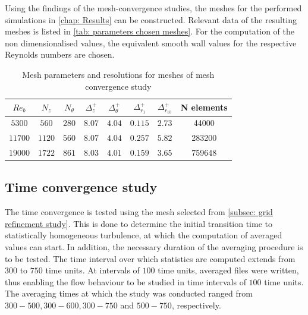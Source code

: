 Using the findings of the mesh-convergence studies, the meshes for the performed simulations in \autoref{chap: Results} can be constructed.
Relevant data of the resulting meshes is listed in \autoref{tab: parameters chosen meshes}.
For the computation of the non dimensionalised values, the equivalent smooth wall values for the respective Reynolds numbers are chosen.
\begin{table}[h!]
    \centering
    \caption[Mesh data of mesh convergence study]{Mesh parameters and resolutions for meshes of mesh convergence study}
    \begin{tabular}{ c c c c c c c c } 
        \toprule
        $Re_b$  & $N_z$     & $N_{\theta}$  & $\Delta^+_z$    & $\Delta^+_\theta$   & $\Delta^+_{r_1}$  & $\Delta^+_{r_{10}}$   & N elements \\
        \midrule
        $5300$  & $560$     & $280$         & $8.07$        & $4.04$            & $0.115$           & $2.73$                & 44000\\ 
        $11700$ & $1120$    & $560$         & $8.07$        & $4.04$            & $0.257$           & $5.82$                & 283200\\     
        $19000$ & $1722$    & $861$         & $8.03$        & $4.01$            & $0.159$           & $3.65$                & 759648\\ 
        \bottomrule
    \end{tabular}
    \label{tab: parameters chosen meshes}
\end{table}


\subsection{Time convergence study}\label{subsec: Time convergence study}
The time convergence is tested using the mesh selected from \autoref{subsec: grid refinement study}.
This is done to determine the initial transition time to statistically homogeneous turbulence, at which the computation of averaged values can start.
In addition, the necessary duration of the averaging procedure is to be tested.
The time interval over which statistics are computed extends from $300$ to $750$ time units.
At intervals of $100$ time units, averaged files were written, thus enabling the flow behaviour to be studied in time intervals of $100$ time units.
The averaging times at which the study was conducted ranged from $300-500, 300 - 600, 300-750$ and $500-750$, respectively.

